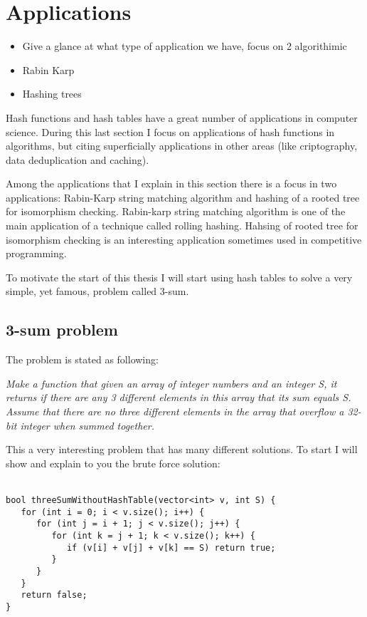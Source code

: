 \chapter{Applications}
\label{cap:Applications}

\begin{itemize}
\item Give a glance at what type of application we have, focus on 2 algorithimic
\item Rabin Karp
\item Hashing trees
\end{itemize}

Hash functions and hash tables have a great number of applications in computer science. During this last section I focus on applications of hash functions in algorithms, but citing superficially applications in other areas (like criptography, data deduplication and caching).

Among the applications that I explain in this section there is a focus in two applications: Rabin-Karp string matching algorithm and hashing of a rooted tree for isomorphism checking. Rabin-karp string matching algorithm is one of the main application of a technique called rolling hashing. Hahsing of rooted tree for isomorphism checking is an interesting application sometimes used in competitive programming.

To motivate the start of this thesis I will start using hash tables to solve a very simple, yet famous, problem called 3-sum.

\section{3-sum problem}

The problem is stated as following:

\textit{Make a function that given an array of integer numbers and an integer S, it returns if there are any 3 different elements in this array that its sum equals S. Assume that there are no three different elements in the array that overflow a 32-bit integer when summed together.}

This a very interesting problem that has many different solutions. To start I will show and explain to you the brute force solution: \\
\\
\bigskip

\begin{lstlisting}
bool threeSumWithoutHashTable(vector<int> v, int S) {
   for (int i = 0; i < v.size(); i++) {
      for (int j = i + 1; j < v.size(); j++) {
         for (int k = j + 1; k < v.size(); k++) {
            if (v[i] + v[j] + v[k] == S) return true;
         }
      }
   }
   return false;
}
\end{lstlisting}

